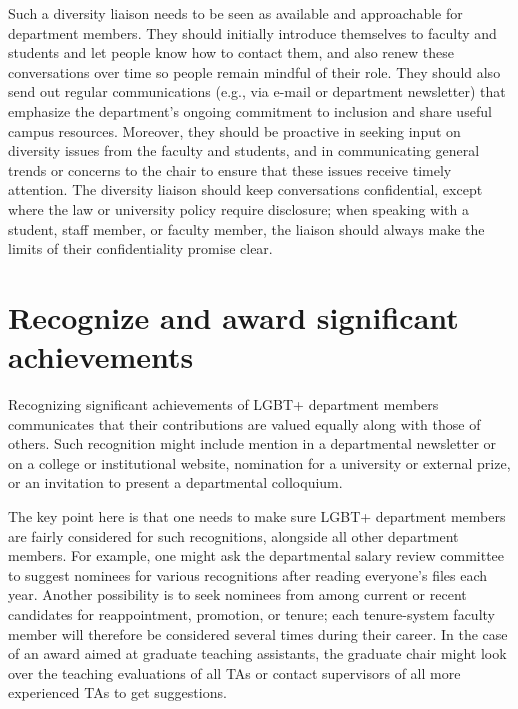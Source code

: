 Such a diversity liaison needs to be seen as available and approachable for department members. They should initially introduce themselves to faculty and students and let people know how to contact them, and also renew these conversations over time so people remain mindful of their role. They should also send out regular communications (e.g., via e-mail or department newsletter) that emphasize the department's ongoing commitment to inclusion and share useful campus resources. Moreover, they should be proactive in seeking input on diversity issues from the faculty and students, and in communicating general trends or concerns to the chair to ensure that these issues receive timely attention. The diversity liaison should keep conversations confidential, except where the law or university policy require disclosure; when speaking with a student, staff member, or faculty member, the liaison should always make the limits of their confidentiality promise clear.


\section {Recognize and award significant achievements}
\label{recognize-achievements}
Recognizing significant achievements of LGBT+ department members communicates that their contributions are valued equally along with those of others. Such recognition might include mention in a departmental newsletter or on a college or institutional website, nomination for a university or external prize, or an invitation to present a departmental colloquium.

The key point here is that one needs to make sure LGBT+ department members are fairly considered for such recognitions, alongside all other department members. For example, one might ask the departmental salary review committee to suggest nominees for various recognitions after reading everyone's files each year. Another possibility is to seek nominees from among current or recent candidates for reappointment, promotion, or tenure; each tenure-system faculty member will therefore be considered several times during their career. In the case of an award aimed at graduate teaching assistants, the graduate chair might look over the teaching evaluations of all TAs or contact supervisors of all more experienced TAs to get suggestions.

